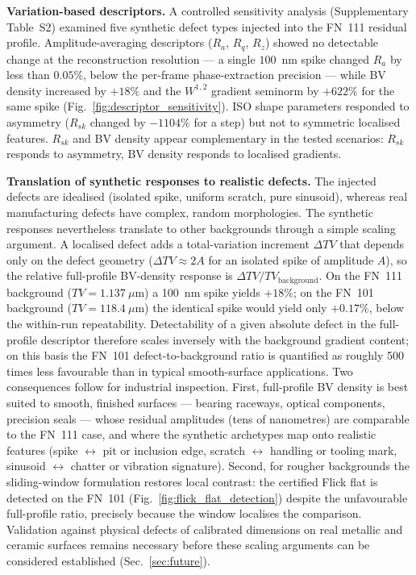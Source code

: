 \documentclass[review]{elsarticle}
\begin{document}
\textbf{Variation-based descriptors.} A controlled sensitivity analysis (Supplementary Table~S2) examined five synthetic defect types injected into the FN~111 residual profile. Amplitude-averaging descriptors ($R_a$, $R_q$, $R_z$) showed no detectable change at the reconstruction resolution — a single $100$~nm spike changed $R_a$ by less than $0.05\%$, below the per-frame phase-extraction precision — while BV density increased by $+18\%$ and the $W^{1,2}$ gradient seminorm by $+622\%$ for the same spike (Fig.~\ref{fig:descriptor_sensitivity}). ISO shape parameters responded to asymmetry ($R_{sk}$ changed by $-1104\%$ for a step) but not to symmetric localised features. $R_{sk}$ and BV density appear complementary in the tested scenarios: $R_{sk}$ responds to asymmetry, BV density responds to localised gradients.

\textbf{Translation of synthetic responses to realistic defects.} The injected defects are idealised (isolated spike, uniform scratch, pure sinusoid), whereas real manufacturing defects have complex, random morphologies. The synthetic responses nevertheless translate to other backgrounds through a simple scaling argument. A localised defect adds a total-variation increment $\Delta TV$ that depends only on the defect geometry ($\Delta TV \approx 2A$ for an isolated spike of amplitude $A$), so the relative full-profile BV-density response is $\Delta TV / TV_{\mathrm{background}}$. On the FN~111 background ($TV=1.137~\mu$m) a 100~nm spike yields $+18\%$; on the FN~101 background ($TV=118.4~\mu$m) the identical spike would yield only $+0.17\%$, below the within-run repeatability. Detectability of a given absolute defect in the full-profile descriptor therefore scales inversely with the background gradient content; on this basis the FN~101 defect-to-background ratio is quantified as roughly 500 times less favourable than in typical smooth-surface applications. Two consequences follow for industrial inspection. First, full-profile BV density is best suited to smooth, finished surfaces — bearing raceways, optical components, precision seals — whose residual amplitudes (tens of nanometres) are comparable to the FN~111 case, and where the synthetic archetypes map onto realistic features (spike $\leftrightarrow$ pit or inclusion edge, scratch $\leftrightarrow$ handling or tooling mark, sinusoid $\leftrightarrow$ chatter or vibration signature). Second, for rougher backgrounds the sliding-window formulation restores local contrast: the certified Flick flat is detected on the FN~101 (Fig.~\ref{fig:flick_flat_detection}) despite the unfavourable full-profile ratio, precisely because the window localises the comparison. Validation against physical defects of calibrated dimensions on real metallic and ceramic surfaces remains necessary before these scaling arguments can be considered established (Sec.~\ref{sec:future}).
\end{document}
